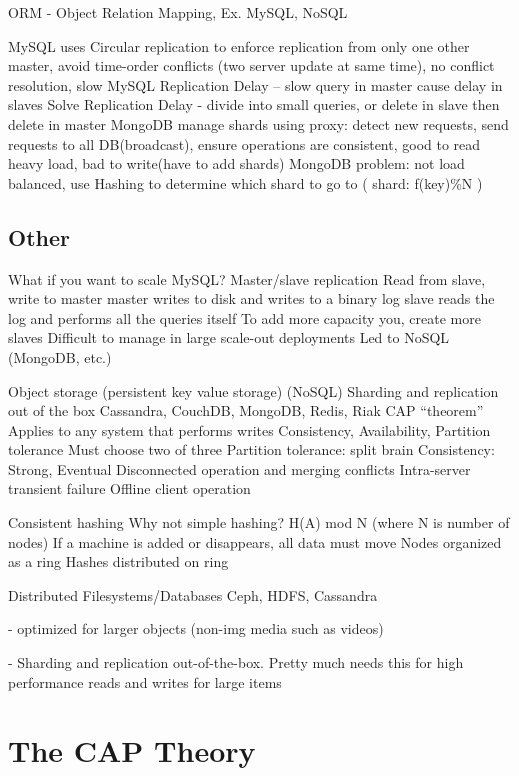 \documentclass[fancy,11pt,titlestyle=display]{style/elegantbook}
\begin{document}
ORM - Object Relation Mapping, Ex. MySQL, NoSQL

MySQL uses Circular replication to enforce replication from only one other master, avoid time-order conflicts (two server update at same time), no conflict resolution, slow
MySQL Replication Delay – slow query in master cause delay in slaves
Solve Replication Delay -  divide into small queries, or delete in slave then delete in master
MongoDB manage shards using proxy:  detect new requests, send requests to all DB(broadcast), ensure operations are consistent, good to read heavy load, bad to write(have to add shards)
MongoDB problem: not load balanced, use Hashing to determine which shard to go to ( shard: f(key)\%N )




\section{Other}

What if you want to scale MySQL?
Master/slave replication
Read from slave, write to master
master writes to disk and writes to a binary log
slave reads the log and performs all the queries itself
To add more capacity you, create more slaves
Difficult to manage in large scale-out deployments
Led to NoSQL (MongoDB, etc.)

Object storage (persistent key value storage) (NoSQL)
Sharding and replication out of the box
Cassandra, CouchDB, MongoDB, Redis, Riak
CAP “theorem”
Applies to any system that performs writes
Consistency, Availability, Partition tolerance
Must choose two of three
Partition tolerance: split brain
Consistency: Strong, Eventual
Disconnected operation and merging conflicts
Intra-server transient failure
Offline client operation

Consistent hashing 
Why not simple hashing?
H(A) mod N     (where N is number of nodes)
If a machine is added or disappears, all data must move
Nodes organized as a ring
Hashes distributed on ring

Distributed Filesystems/Databases
Ceph, HDFS, Cassandra

- optimized for larger objects (non-img media such as videos)

- Sharding and replication out-of-the-box. Pretty much needs this for high performance reads and writes for large items




\chapter{The CAP Theory}
\end{document}
